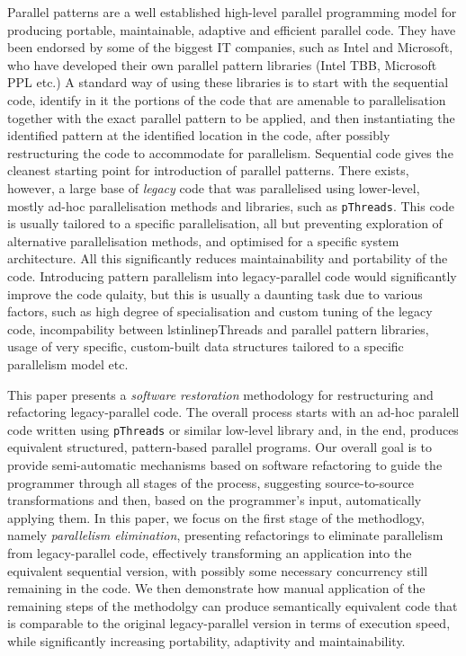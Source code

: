 \documentclass{llncs}
\begin{document}
Parallel patterns are a well established high-level parallel programming model for producing portable, maintainable, adaptive and efficient parallel code. They have been endorsed by some of the biggest IT companies, such as Intel and Microsoft, who have developed their own parallel pattern libraries (Intel TBB, Microsoft PPL etc.) A standard way of using these libraries is to start with the sequential code, identify in it the portions of the code that are amenable to parallelisation together with the exact parallel pattern to be applied, and then instantiating the identified pattern at the identified location in the code, after possibly restructuring the code to accommodate for parallelism. Sequential code gives the cleanest starting point for introduction of parallel patterns. There exists, however, a large base of \emph{legacy} code that was parallelised using lower-level, mostly ad-hoc parallelisation methods and libraries, such as \lstinline{pThreads}. This code is usually tailored to a specific parallelisation, all but preventing exploration of alternative parallelisation methods, and optimised for a specific system architecture. All this significantly reduces maintainability and portability of the code. %
Introducing pattern parallelism into legacy-parallel code would significantly improve the code qulaity, but this is usually a daunting task due to various factors, such as high degree of specialisation and custom tuning of the legacy code, incompability between lstinline{pThreads} and parallel pattern libraries, usage of very specific, custom-built data structures tailored to a specific parallelism model etc.
  
This paper presents a \emph{software restoration} methodology for restructuring and refactoring legacy-parallel code. The overall process starts with an ad-hoc paralell code written using \lstinline{pThreads} or similar low-level library and, in the end, produces equivalent structured, pattern-based parallel programs. Our overall goal is to provide semi-automatic mechanisms based on software refactoring to guide the programmer through all stages of the process, suggesting source-to-source transformations and then, based on the programmer's input, automatically applying them. In this paper, we focus on the first stage of the methodlogy, namely \emph{parallelism elimination}, presenting refactorings to eliminate parallelism from legacy-parallel code, effectively transforming an application into the equivalent sequential version, with possibly some necessary concurrency still remaining in the code. We then demonstrate how manual application of the remaining steps of the methodolgy can produce semantically equivalent code that is comparable to the original legacy-parallel version in terms of execution speed, while significantly increasing portability, adaptivity and maintainability.
\end{document}
